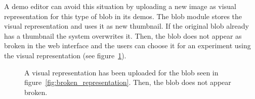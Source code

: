 A demo editor can avoid this situation by uploading a new image as visual representation for this type of blob in its demos. The blob module stores the visual representation and uses it as new thumbnail. If the original blob already has a thumbnail the system overwrites it. Then, the blob does not appear as broken in the web interface and the users can choose it for an experiment using the visual representation (see figure~\ref{fig:visual_representation}).
%
\begin{figure}[h]
\centering
{}
\caption{A visual representation has been uploaded for the blob seen in figure~\ref{fig:broken_representation}. Then, the blob does not appear broken.} 
\label{fig:visual_representation}
\end{figure}
%


